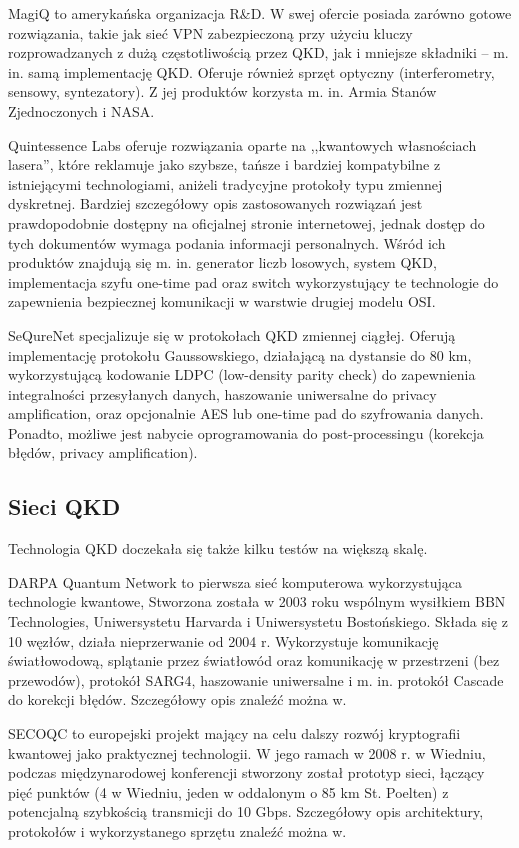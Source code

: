 \documentclass[10pt]{article}
\begin{document}
MagiQ\cite{magiq} to amerykańska organizacja R\&D. W swej ofercie posiada zarówno gotowe rozwiązania, 
takie jak sieć VPN zabezpieczoną przy użyciu kluczy rozprowadzanych z dużą częstotliwością przez QKD, 
jak i mniejsze składniki -- m. in. samą implementację QKD. Oferuje również sprzęt optyczny 
(interferometry, sensowy, syntezatory). Z jej produktów korzysta m. in. Armia Stanów Zjednoczonych 
i NASA.

Quintessence Labs\cite{quintessencelabs} oferuje rozwiązania oparte na ,,kwantowych własnościach 
lasera'', które reklamuje jako szybsze, tańsze i bardziej kompatybilne z istniejącymi technologiami, 
aniżeli tradycyjne protokoły typu zmiennej dyskretnej. Bardziej szczegółowy opis zastosowanych 
rozwiązań jest prawdopodobnie dostępny na oficjalnej stronie internetowej, jednak dostęp do tych
dokumentów wymaga podania informacji personalnych. Wśród ich produktów znajdują się m. in. generator
liczb losowych, system QKD, implementacja szyfu one-time pad oraz switch wykorzystujący te 
technologie do zapewnienia bezpiecznej komunikacji w warstwie drugiej modelu OSI.

SeQureNet\cite{sequrenet} specjalizuje się w protokołach QKD zmiennej ciągłej. Oferują implementację
protokołu Gaussowskiego, działającą na dystansie do 80 km, wykorzystującą kodowanie LDPC (low-density
parity check) do zapewnienia integralności przesyłanych danych, haszowanie uniwersalne do privacy
amplification, oraz opcjonalnie AES lub one-time pad do szyfrowania danych. Ponadto, możliwe jest
nabycie oprogramowania do post-processingu (korekcja błędów, privacy amplification).


\subsection{Sieci QKD}

Technologia QKD doczekała się także kilku testów na większą skalę.

DARPA Quantum Network\cite{darpa} to pierwsza sieć komputerowa wykorzystująca technologie kwantowe, 
Stworzona została w 2003 roku wspólnym wysiłkiem BBN Technologies, Uniwersystetu Harvarda i 
Uniwersystetu Bostońskiego. Składa się z 10 węzłów, działa nieprzerwanie od 2004 r. Wykorzystuje 
komunikację światłowodową, splątanie przez światłowód oraz komunikację w przestrzeni (bez przewodów),
protokół SARG4, haszowanie uniwersalne i m. in. protokół Cascade do korekcji błędów. Szczegółowy opis
znaleźć można w\cite{darpa05}.

SECOQC\footnotemark\cite{secoqc} to europejski projekt mający na celu dalszy rozwój kryptografii 
kwantowej jako praktycznej technologii. W jego ramach w 2008 r. w Wiedniu, podczas międzynarodowej
konferencji stworzony został prototyp sieci, łączący pięć punktów (4 w Wiedniu, jeden w oddalonym
o 85 km St. Poelten) z potencjalną szybkością transmicji do 10 Gbps. Szczegółowy opis architektury,
protokołów i wykorzystanego sprzętu znaleźć można w\cite{Poppe08}.
\end{document}
